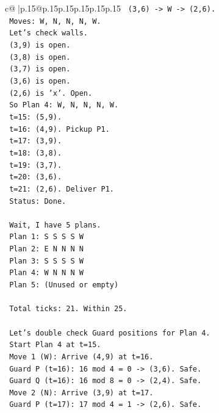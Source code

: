 \documentclass{article}
\begin{document}
{\begin{supertabular}{c@{$\;$}|p{.15\linewidth}@{}p{.15\linewidth}p{.15\linewidth}p{.15\linewidth}p{.15\linewidth}p{.15\linewidth}}
{{{\texttt{      (3,6) {-}> W {-}> (2,6).} \\
\texttt{      Moves: W, N, N, N, W.} \\
\texttt{      Let's check walls.} \\
\texttt{      (3,9) is open.} \\
\texttt{      (3,8) is open.} \\
\texttt{      (3,7) is open.} \\
\texttt{      (3,6) is open.} \\
\texttt{      (2,6) is 'x'. Open.} \\
\texttt{      So Plan 4: W, N, N, N, W.} \\
\texttt{      t=15: (5,9).} \\
\texttt{      t=16: (4,9). Pickup P1.} \\
\texttt{      t=17: (3,9).} \\
\texttt{      t=18: (3,8).} \\
\texttt{      t=19: (3,7).} \\
\texttt{      t=20: (3,6).} \\
\texttt{      t=21: (2,6). Deliver P1.} \\
\texttt{      Status: Done.} \\
\\ 
\texttt{      Wait, I have 5 plans.} \\
\texttt{      Plan 1: S S S S W} \\
\texttt{      Plan 2: E N N N N} \\
\texttt{      Plan 3: S S S S W} \\
\texttt{      Plan 4: W N N N W} \\
\texttt{      Plan 5: (Unused or empty)} \\
\\ 
\texttt{      Total ticks: 21. Within 25.} \\
\\ 
\texttt{      Let's double check Guard positions for Plan 4.} \\
\texttt{      Start Plan 4 at t=15.} \\
\texttt{      Move 1 (W): Arrive (4,9) at t=16.} \\
\texttt{         Guard P (t=16): 16 mod 4 = 0 {-}> (3,6). Safe.} \\
\texttt{         Guard Q (t=16): 16 mod 8 = 0 {-}> (2,4). Safe.} \\
\texttt{      Move 2 (N): Arrive (3,9) at t=17.} \\
\texttt{         Guard P (t=17): 17 mod 4 = 1 {-}> (2,6). Safe.} \\
}}}
\end{supertabular}}
\end{document}
